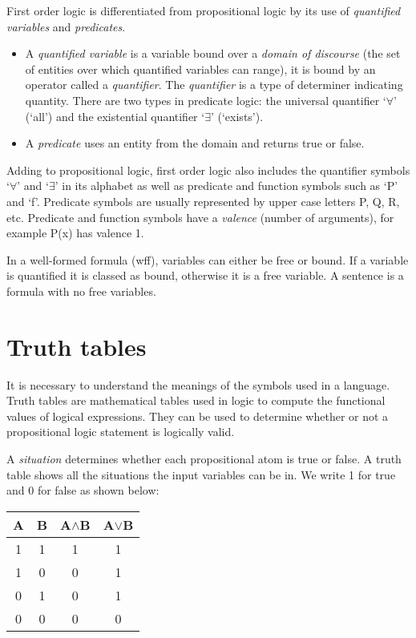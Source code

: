 \documentclass{report}
\begin{document}
First order logic is differentiated from propositional logic by its use of \textit{quantified variables} and \textit{predicates}. 

\begin{itemize}
\item A \textit{quantified variable} is a variable bound over a \textit{domain of discourse} (the set of entities over which quantified variables can range), it is bound by an operator called a \textit{quantifier}. The \textit{quantifier} is a type of determiner indicating quantity. There are two types in predicate logic: the universal quantifier `$\forall$' (`all') and the existential quantifier `$\exists$' (`exists').
\item A \textit{predicate} uses an entity from the domain and returns true or false. 
\end{itemize}

Adding to propositional logic, first order logic also includes the quantifier symbols `$\forall$' and `$\exists$' in its alphabet as well as predicate and function symbols such as `P' and `f'. Predicate symbols are usually represented by upper case letters P, Q, R, etc. Predicate and function symbols have a \textit{valence} (number of arguments), for example P(x) has valence 1.

In a well-formed formula (wff), variables can either be free or bound. If a variable is quantified it is classed as bound, otherwise it is a free variable. A sentence is a formula with no free variables.

\section{Truth tables}
\label{sec:truth_tables}

It is necessary to understand the meanings of the symbols used in a language. Truth tables are mathematical tables used in logic to compute the functional values of logical expressions. They can be used to determine whether or not a propositional logic statement is logically valid.

A \textit{situation} determines whether each propositional atom is true or false. A truth table shows all the situations the input variables can be in. We write 1 for true and 0 for false as shown below:

\vspace{5 mm}
\begin{center}
  \begin{tabular}{ || c | c || c | c || }
    \hline
    A & B & A$\land$B & A$\lor$B \\ \hline
    1 & 1 & 1 & 1 \\
    1 & 0 & 0 & 1\\
    0 & 1 & 0 & 1 \\
    0 & 0 & 0 & 0 \\
    \hline
  \end{tabular}
\end{center}
\vspace{5 mm}
\end{document}
